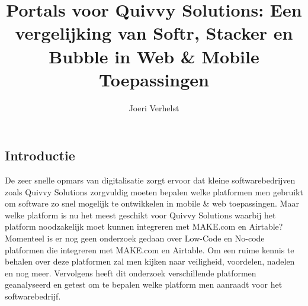 \documentclass[a0,portrait]{hogent-poster}
\title{Portals voor Quivvy Solutions: Een vergelijking van Softr, Stacker en Bubble in Web \& Mobile Toepassingen}
\subtitle{}
\author{Joeri Verhelst}
\begin{document}
\maketitle


\begin{multicols}{2} %

\section{Introductie}
De zeer snelle opmars van digitalisatie zorgt ervoor dat kleine softwarebedrijven zoals 
Quivvy Solutions zorgvuldig moeten bepalen welke platformen men gebruikt om software 
zo snel mogelijk te ontwikkelen in mobile \& web toepassingen. 
Maar welke platform is nu het meest geschikt voor Quivvy Solutions waarbij het platform 
noodzakelijk moet kunnen integreren met MAKE.com en Airtable? Momenteel is er nog 
geen onderzoek gedaan over Low-Code en No-code platformen die integreren met MAKE.com 
en Airtable. Om een ruime kennis te behalen over deze platformen zal men kijken naar veiligheid, 
voordelen, nadelen en nog meer. Vervolgens heeft dit onderzoek verschillende platformen 
geanalyseerd en getest om te bepalen welke platform men aanraadt voor het softwarebedrijf.


\end{multicols}
\end{document}
